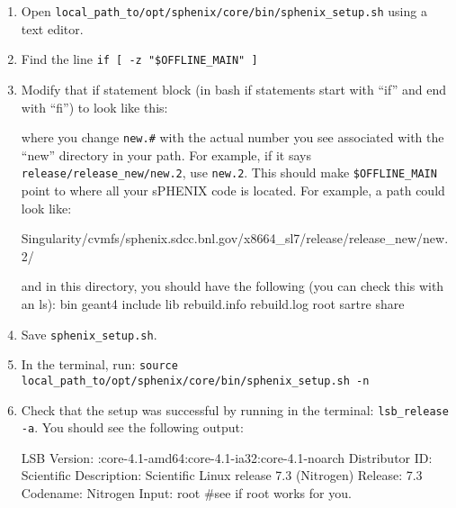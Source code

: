 \documentclass[12pt]{article}
\begin{document}
\begin{enumerate}
\item Open \verb|local_path_to/opt/sphenix/core/bin/sphenix_setup.sh| using a text editor.
\item Find the line \verb|if [ -z "$OFFLINE_MAIN" ]|
\item Modify that if statement block (in bash if statements start with ``if'' and end with ``fi'') to look like this:

\begin{tcolorbox}
\end{tcolorbox}

where you change \verb|new.#| with the actual number you see associated with the ``new'' directory in your path. For example, if it says \verb|release/release_new/new.2|, use \verb|new.2|.
This should make \verb|$OFFLINE_MAIN| point to where all your sPHENIX code is located.
For example, a path could look like:

\begin{tcolorbox}
\begin{verbnobox}[\scriptsize]
Singularity/cvmfs/sphenix.sdcc.bnl.gov/x8664_sl7/release/release_new/new.2/
\end{verbnobox}  
\end{tcolorbox}

and in this directory, you should have the following (you can check this with an ls):
bin  geant4  include  lib  rebuild.info  rebuild.log  root  sartre  share

\item Save \verb|sphenix_setup.sh|.

\item In the terminal, run: \verb|source local_path_to/opt/sphenix/core/bin/sphenix_setup.sh -n|

\item Check that the setup was successful by running in the terminal: \verb|lsb_release -a|.
You should see the following output:

\begin{tcolorbox}
\begin{verbnobox}[\scriptsize]
LSB Version:	:core-4.1-amd64:core-4.1-ia32:core-4.1-noarch
Distributor ID:	Scientific
Description:	Scientific Linux release 7.3 (Nitrogen)
Release:	7.3
Codename:	Nitrogen
Input: root #see if root works for you.
\end{verbnobox}  
\end{tcolorbox}

\end{enumerate}
\end{document}
